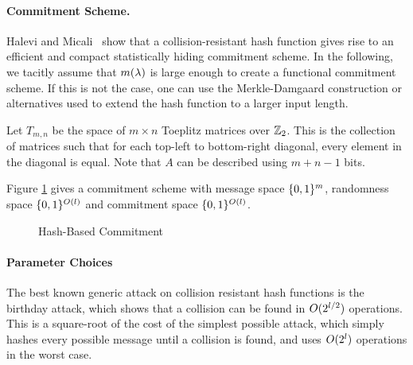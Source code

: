 \paragraph{Commitment Scheme.} Halevi and Micali~\cite{HalMic96} show that a collision-resistant hash function gives rise to an efficient and compact statistically hiding commitment scheme. In the following, we tacitly assume that $m(\lambda)$ is large enough to create a functional commitment scheme. If this is not the case, one can use the Merkle-Damgaard construction or alternatives \cite{Lucks04,NandiP10} used to extend the hash function to a larger input length.

Let $T_{m,n}$ be the space of $m \times n$ Toeplitz matrices over $\mathbb{Z}_2$. This is the collection of matrices such that for each top-left to bottom-right diagonal, every element in the diagonal is equal. Note that $A$ can be described using $m+n-1$ bits.

Figure \ref{alg:com:hash} gives a commitment scheme with message space $\{0,1\}^{m}$, randomness space $\{0,1\}^{O(l)}$ and commitment space $\{0,1\}^{O(l)}$.

\begin{figure}[t]
  \caption{Hash-Based Commitment}
\label{alg:com:hash}
\end{figure}

\paragraph{Parameter Choices}

The best known generic attack on collision resistant hash functions is the birthday attack, which shows that a collision can be found in $O(2^{l / 2})$ operations. This is a square-root of the cost of the simplest possible attack, which simply hashes every possible message until a collision is found, and uses $O(2^{l})$ operations in the worst case.